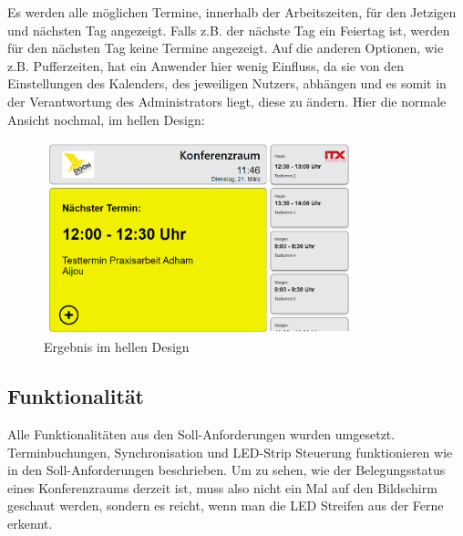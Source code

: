 Es werden alle möglichen Termine, innerhalb der Arbeitszeiten, für den Jetzigen und nächsten Tag angezeigt.
Falls z.B. der nächste Tag ein Feiertag ist, werden für den nächsten Tag keine Termine angezeigt.
Auf die anderen Optionen, wie z.B. Pufferzeiten, hat ein Anwender hier wenig Einfluss, da sie von den Einstellungen des Kalenders, des jeweiligen Nutzers, abhängen und es somit in der Verantwortung des Administrators liegt, diese zu ändern.
\newline
\newline
Hier die normale Ansicht nochmal, im hellen Design:
\par\vspace{1cm}
\begin{figure}[h]
    \centering
    \includegraphics[width=0.8\textwidth]{Bilder/Ergebnis_lightMode}
    \caption{Ergebnis im hellen Design}
    \label{fig:Ergebnis im hellen Design}
\par\vspace{1cm}
\end{figure}
\justifying
\newline
\newline
\pagebreak
\subsection{Funktionalität}\label{subsec:funktionalitaet}
Alle Funktionalitäten aus den Soll-Anforderungen wurden umgesetzt.
\newline
Terminbuchungen, Synchronisation und LED-Strip Steuerung funktionieren wie in den Soll-Anforderungen beschrieben.
Um zu sehen, wie der Belegungsstatus eines Konferenzraums derzeit ist, muss also nicht ein Mal auf den Bildschirm geschaut werden, sondern es reicht, wenn man die LED Streifen aus der Ferne erkennt.
\newline
\newline
